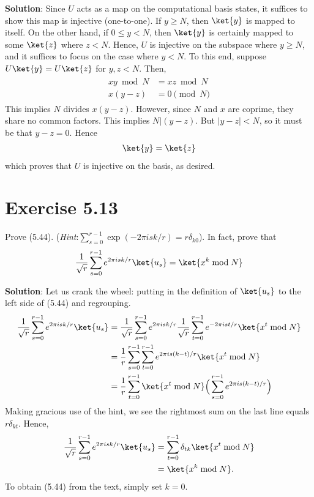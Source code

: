 \documentclass{book}
\begin{document}
    \textbf{Solution}: Since $U$ acts as a map on the computational basis states, it suffices to show this map is injective (one-to-one). If $y\geq N$, then $\ket{y}$ is mapped to itself. On the other hand, if $0\leq y < N$, then $\ket{y}$ is certainly mapped to some $\ket{z}$ where $z< N$. Hence, $U$ is injective on the subspace where $y\geq N$, and it suffices to focus on the case where $y< N$. To this end, suppose $U\ket{y} = U\ket{z}$ for $y,z < N$. Then,
    \begin{align}
    \begin{aligned}
        xy\bmod{N} &= xz\bmod{N} \\
        x(y-z) &= 0 \pmod{N}
    \end{aligned}
    \end{align}
    This implies $N$ divides $x(y-z)$. However, since $N$ and $x$ are coprime, they share no common factors. This implies $N|(y-z)$. But $|y-z| < N$, so it must be that $y-z = 0$. Hence
    \begin{align}
        \ket{y} = \ket{z}
    \end{align}
    which proves that $U$ is injective on the basis, as desired.

\section*{Exercise 5.13}
    Prove (5.44). (\emph{Hint}:$\sum_{s=0}^{r-1}\exp(-2\pi i sk/r)=r\delta_{k0}$). In fact, prove that
    \begin{align}
        \frac{1}{\sqrt{r}}\sum_{s=0}^{r-1}e^{2\pi isk/r}\ket{u_s} = \ket{x^k\bmod N}
    \end{align}

    \textbf{Solution}: Let us crank the wheel: putting in the definition of $\ket{u_s}$ to the left side of (5.44) and regrouping.
    \begin{align}
        \frac{1}{\sqrt{r}}\sum_{s=0}^{r-1}e^{2\pi isk/r}\ket{u_s} &= \frac{1}{\sqrt{r}}\sum_{s=0}^{r-1}e^{2\pi isk/r} \frac{1}{\sqrt{r}}\sum_{t=0}^{r-1}e^{-2\pi ist/r}\ket{x^t\bmod N} \\
        &= \frac{1}{r}\sum_{s=0}^{r-1}\sum_{t=0}^{r-1}e^{2\pi is(k-t)/r}\ket{x^t\bmod N} \\
        &=\frac{1}{r}\sum_{t=0}^{r-1}\ket{x^t\bmod N}\Big(\sum_{s=0}^{r-1}e^{2\pi is(k-t)/r}\Big)
    \end{align}
    Making gracious use of the hint, we see the rightmost sum on the last line equals $r\delta_{kt}$. Hence,
    \begin{align}
        \frac{1}{\sqrt{r}}\sum_{s=0}^{r-1}e^{2\pi isk/r}\ket{u_s} &= \sum_{t=0}^{r-1}\delta_{tk}\ket{x^t \bmod N} \\
        &= \ket{x^k \bmod N}.
    \end{align}
    To obtain (5.44) from the text, simply set $k=0$.
\end{document}
